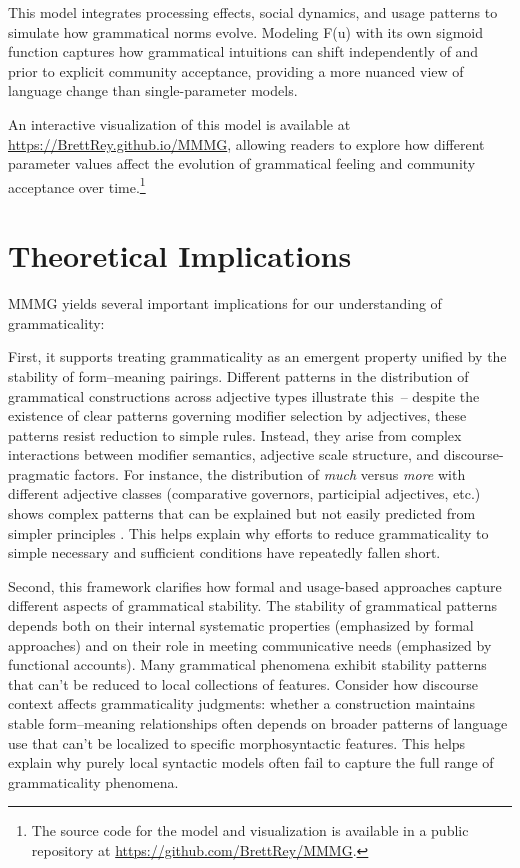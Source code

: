 \documentclass[12pt,letterpaper]{article}
\begin{document}
This model integrates processing effects, social dynamics, and usage patterns to simulate how grammatical norms evolve. Modeling F(u) with its own sigmoid function captures how grammatical intuitions can shift independently of and prior to explicit community acceptance, providing a more nuanced view of language change than single-parameter models.

An interactive visualization of this model is available at \\
\href{https://BrettRey.github.io/MMMG}{https://BrettRey.github.io/MMMG}, allowing readers to explore how different parameter values affect the evolution of grammatical feeling and community acceptance over time.\footnote{The source code for the model and visualization is available in a public repository at \href{https://github.com/BrettRey/MMMG}{https://github.com/BrettRey/MMMG}.}






\newpage

\section{Theoretical Implications}\label{sec:implications}

MMMG yields several important implications for our understanding of grammaticality:

First, it supports treating grammaticality as an emergent property unified by the stability of form--meaning pairings. Different patterns in the distribution of grammatical constructions across adjective types illustrate this~-- despite the existence of clear patterns governing modifier selection by adjectives, these patterns resist reduction to simple rules. Instead, they arise from complex interactions between modifier semantics, adjective scale structure, and discourse-pragmatic factors. For instance, the distribution of \textit{much} versus \textit{more} with different adjective classes (comparative governors, participial adjectives, etc.) shows complex patterns that can be explained but not easily predicted from simpler principles \autocite{reynolds2024why}. This helps explain why efforts to reduce grammaticality to simple necessary and sufficient conditions have repeatedly fallen short.

Second, this framework clarifies how formal and usage-based approaches capture different aspects of grammatical stability. The stability of grammatical patterns depends both on their internal systematic properties (emphasized by formal approaches) and on their role in meeting communicative needs (emphasized by functional accounts). Many grammatical phenomena exhibit stability patterns that can't be reduced to local collections of features. Consider how discourse context affects grammaticality judgments: whether a construction maintains stable form--meaning relationships often depends on broader patterns of language use that can't be localized to specific morphosyntactic features. This helps explain why purely local syntactic models often fail to capture the full range of grammaticality phenomena.
\end{document}
